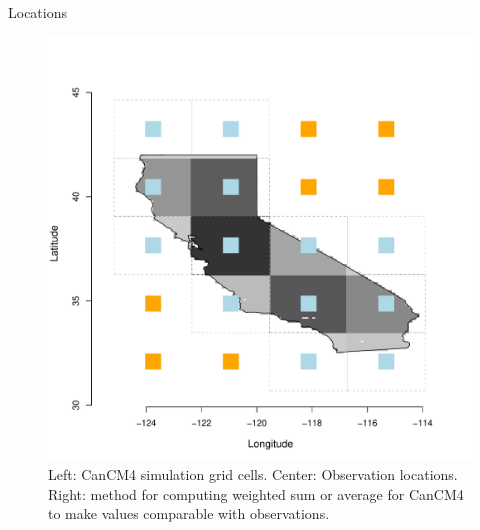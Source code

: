 \documentclass[mathserif, 11pt, t]{beamer}
\begin{document}
\begin{frame}{Locations}
\begin{figure}
\begin{center}
\includegraphics[scale=0.18]{figs/cal_mod_box3.pdf}
\end{center}
\caption{Left: CanCM4 simulation grid cells. Center: Observation locations. Right: method for computing weighted sum or average for CanCM4 to make values comparable with observations.}
\end{figure}

\end{frame}
\end{document}
